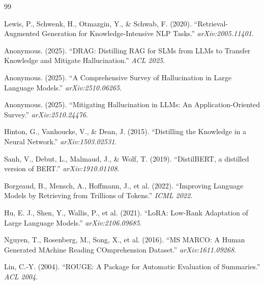 \documentclass[11pt,a4paper]{article}
\begin{document}
\begin{thebibliography}{99}

 Lewis, P., Schwenk, H., Otmazgin, Y., \& Schwab, F. (2020). ``Retrieval-Augmented Generation for Knowledge-Intensive NLP Tasks.'' \textit{arXiv:2005.11401}.

 Anonymous. (2025). ``DRAG: Distilling RAG for SLMs from LLMs to Transfer Knowledge and Mitigate Hallucination.'' \textit{ACL 2025}.

 Anonymous. (2025). ``A Comprehensive Survey of Hallucination in Large Language Models.'' \textit{arXiv:2510.06265}.

 Anonymous. (2025). ``Mitigating Hallucination in LLMs: An Application-Oriented Survey.'' \textit{arXiv:2510.24476}.

 Hinton, G., Vanhoucke, V., \& Dean, J. (2015). ``Distilling the Knowledge in a Neural Network.'' \textit{arXiv:1503.02531}.

 Sanh, V., Debut, L., Malmaud, J., \& Wolf, T. (2019). ``DistilBERT, a distilled version of BERT.'' \textit{arXiv:1910.01108}.

 Borgeaud, B., Mensch, A., Hoffmann, J., et al. (2022). ``Improving Language Models by Retrieving from Trillions of Tokens.'' \textit{ICML 2022}.

 Hu, E. J., Shen, Y., Wallis, P., et al. (2021). ``LoRA: Low-Rank Adaptation of Large Language Models.'' \textit{arXiv:2106.09685}.

 Nguyen, T., Rosenberg, M., Song, X., et al. (2016). ``MS MARCO: A Human Generated MAchine Reading COmprehension Dataset.'' \textit{arXiv:1611.09268}.

 Lin, C.-Y. (2004). ``ROUGE: A Package for Automatic Evaluation of Summaries.'' \textit{ACL 2004}.

\end{thebibliography}
\end{document}
